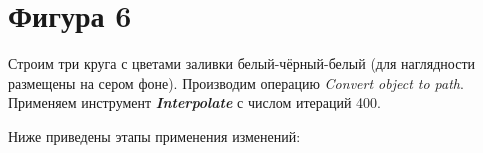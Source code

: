 \newpage
\section[Фигура 6]{Фигура 6}

Строим три круга с цветами заливки белый-чёрный-белый 
(для наглядности размещены на сером фоне). 
Производим операцию \textit{Convert object to path}. 
Применяем инструмент \textit{\textbf{Interpolate}} с числом итераций 400.
\vspace{12pt}

Ниже приведены этапы применения изменений:
\begin{figure}[H]
    \begin{minipage}[h]{1\linewidth}
    \end{minipage}
\end{figure}
